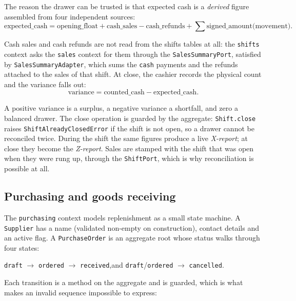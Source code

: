 \documentclass[11pt,a4paper]{article}
\begin{document}
The reason the drawer can be trusted is that expected cash is a \emph{derived} figure assembled
from four independent sources:
\begin{equation}
\text{expected\_cash} = \text{opening\_float} + \text{cash\_sales}
- \text{cash\_refunds} + \sum \text{signed\_amount(movement)}.
\end{equation}

\noindent
Cash sales and cash refunds are not read from the shifts tables at all: the \texttt{shifts} context
asks the \texttt{sales} context for them through the \texttt{SalesSummaryPort}, satisfied by
\texttt{SalesSummaryAdapter}, which sums the \texttt{cash} payments and the refunds attached to the
sales of that shift. At close, the cashier records the physical count and the variance falls out:
\begin{equation}
\text{variance} = \text{counted\_cash} - \text{expected\_cash}.
\end{equation}

A positive variance is a surplus, a negative variance a shortfall, and zero a balanced drawer. The
close operation is guarded by the aggregate: \texttt{Shift.close} raises
\texttt{ShiftAlreadyClosedError} if the shift is not open, so a drawer cannot be reconciled twice.
During the shift the same figures produce a live \emph{X-report}; at close they become the
\emph{Z-report}. Sales are stamped with the shift that was open when they were rung up, through the
\texttt{ShiftPort}, which is why reconciliation is possible at all.

\subsection{Purchasing and goods receiving}

The \texttt{purchasing} context models replenishment as a small state machine. A \texttt{Supplier}
has a name (validated non-empty on construction), contact details and an active flag. A
\texttt{PurchaseOrder} is an aggregate root whose status walks through four states:

\begin{center}
\texttt{draft} $\rightarrow$ \texttt{ordered} $\rightarrow$ \texttt{received},\quad and
\texttt{draft}/\texttt{ordered} $\rightarrow$ \texttt{cancelled}.
\end{center}

Each transition is a method on the aggregate and is guarded, which is what makes an invalid sequence
impossible to express:
\end{document}

